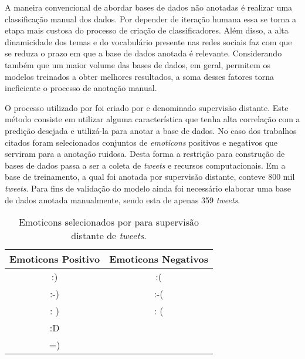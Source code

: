 A maneira convencional de abordar bases de dados não anotadas é realizar uma
classificação manual dos dados.
Por depender de iteração humana essa se torna a etapa mais custosa do processo
de criação de classificadores.
Além disso, a alta dinamicidade dos temas e do vocabulário presente nas redes
sociais faz com que se reduza o prazo em que a base de dados anotada é
relevante.
Considerando também que um maior volume das bases de dados, em geral, permitem
os modelos treinados a obter melhores resultados, a soma desses fatores torna
ineficiente o processo de anotação manual.

O processo utilizado por \citet{go09} foi criado por \citet{read05} e denominado
supervisão distante.
Este método consiste em utilizar alguma característica que tenha alta correlação
com a predição desejada e utilizá-la para anotar a base de dados.
No caso dos trabalhos citados foram selecionados conjuntos de \textit{emoticons}
positivos e negativos que serviram para a anotação ruidosa.
Desta forma a restrição para construção de bases de dados passa a ser a coleta
de \textit{tweets} e recursos computacionais.
Em \citet{go09} a base de treinamento, a qual foi anotada por supervisão
distante, conteve 800 mil \textit{tweets}.
Para fins de validação do modelo ainda foi necessário elaborar uma base de
dados anotada manualmente, sendo esta de apenas 359 \textit{tweets}.

\begin{table}[h]
    \begin{center}
        \begin{tabular}{| c c |}
        \hline
        \textbf{Emoticons Positivo} & \textbf{Emoticons Negativos} \\ \hline
        :)&:( \\
        :-)&:-(\\
        : )&: (\\
        :D& \\
        =)& \\ \hline
        \end{tabular}
        \caption{Emoticons selecionados por \citet{go09} para supervisão
        distante de \textit{tweets}.}
        \label{tab:supervision_emoticons}
    \end{center}
\end{table}

